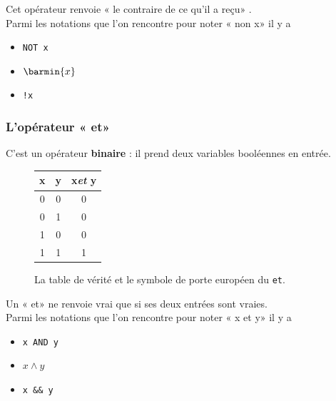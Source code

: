 Cet opérateur renvoie « le contraire de ce qu'il a reçu» .\\
Parmi les notations que l'on rencontre pour noter « non x»  il y a
\begin{itemize}
    \item 	 \texttt{NOT x}
    \item 	$\barmin{x}$
    \item 	\texttt{!x}
\end{itemize}


\subsubsection*{L'opérateur « et» }

C'est un opérateur \textbf{binaire} : il prend deux variables booléennes en entrée.

\begin{figure}[H]
    \begin{center}
        \begin{tabular}{|c|c|c|}
            \hline\rowcolor{UGLiOrange}
            {\boxfont\color{white}x} & {\boxfont\color{white}y} & {\boxfont\color{white}x\textit{et} y} \\
            \hline
            0                        & 0                        & 0                                     \\
            \hline
            0                        & 1                        & 0                                     \\
            \hline
            1                        & 0                        & 0                                     \\
            \hline
            1                        & 1                        & 1                                     \\
            \hline
        \end{tabular}
        \hspace{3em}
    \end{center}
    \caption*{La table de vérité et le symbole de porte européen du \texttt{et}.}
\end{figure}
Un « et»  ne renvoie vrai que si ses deux entrées sont vraies.\\
Parmi les notations que l'on rencontre pour noter « x et y»  il y a
\begin{itemize}
    \item 	 \texttt{x AND y}
    \item 	$x\wedge y$
    \item 	\texttt{x \&\& y}
\end{itemize}


